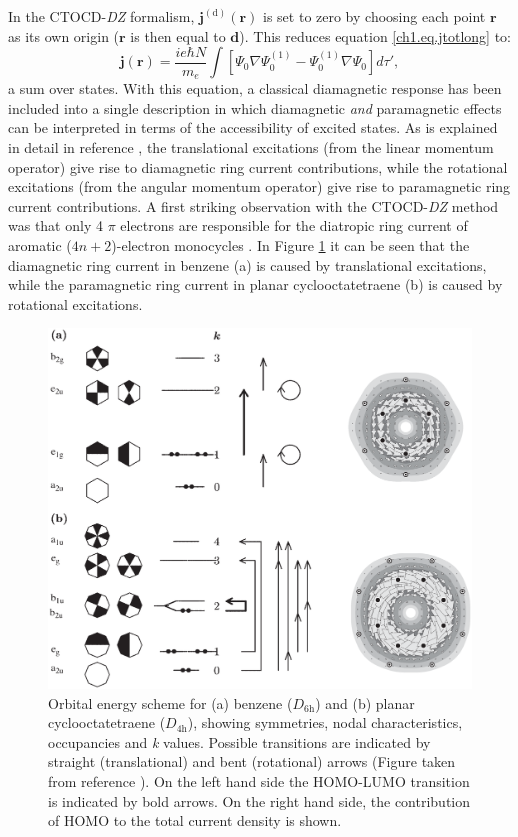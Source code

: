In the CTOCD-\textit{DZ} formalism, $\mathbf{j}^{(\mathrm{d})}(\mathbf{r})$ is set to zero by choosing each point $\mathbf{r}$ as its own origin ($\mathbf{r}$ is then equal to $\mathbf{d}$). This reduces equation \ref{ch1.eq.jtotlong} to:
\begin{equation}
\mathbf{j}(\mathbf{r}) = \frac{ie{\hbar}N}{m_e} \int [ \Psi_0 \nabla \Psi^{(1)}_0 - \Psi^{(1)}_0 \nabla \Psi_0 ] d\tau',
\label{ch1.eq.jtotdz}
\end{equation}
a sum over states. With this equation, a classical diamagnetic response has been included into a single description in which diamagnetic \textit{and} paramagnetic effects can be interpreted in terms of the accessibility of excited states. As is explained in detail in reference \cite{ipso1}, the translational excitations (from the linear momentum operator) give rise to diamagnetic ring current contributions, while the rotational excitations (from the angular momentum operator) give rise to paramagnetic ring current contributions. A first striking observation with the CTOCD-\textit{DZ} method was that only 4 $\pi$ electrons are responsible for the diatropic ring current of aromatic ($4n+2$)-electron monocycles \cite{ipso1}. In Figure \ref{ch1.fig.orbital_scheme} it can be seen that the diamagnetic ring current in benzene (a) is caused by translational excitations, while the paramagnetic ring current in planar cyclooctatetraene (b) is caused by rotational excitations.
\begin{figure}[hb]
\center
\includegraphics[scale=0.32]{introduction/figures/orbital_scheme.eps}
\caption{Orbital energy scheme for (a) benzene ($D_\mathrm{6h}$) and (b) planar cyclooctatetraene ($D_\mathrm{4h}$), showing symmetries, nodal characteristics, occupancies and \textit{k} values. Possible transitions are indicated by straight (translational) and bent (rotational) arrows (Figure taken from reference \cite{ipso2}). On the left hand side the HOMO-LUMO transition is indicated by bold arrows. On the right hand side, the contribution of HOMO to the total current density is shown.}
\label{ch1.fig.orbital_scheme}
\end{figure}
